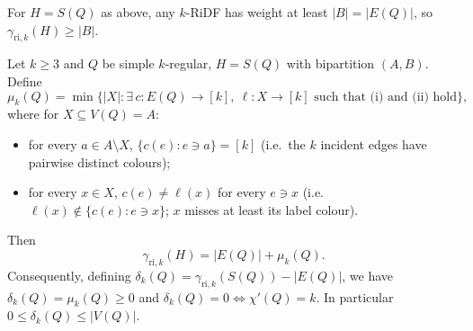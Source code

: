 \documentclass[10pt,a4paper]{amsart}
\newcommand{\gri}{\gamma_{\mathrm{ri},k}}
\newcommand{\setK}{[k]}
\begin{document}
\begin{corollary}\label{cor:lowerbound}
For $H=S(Q)$ as above, any $k$-RiDF has weight at least $|B|=|E(Q)|$, so $\gri(H)\ge|B|$.
\end{corollary}

\begin{theorem}\label{thm:representation}
Let $k\ge 3$ and $Q$ be simple $k$-regular, $H=S(Q)$ with bipartition $(A,B)$.
Define
\[
\mu_{k}(Q)=\min\{|X|: \exists\,c\colon E(Q)\to\setK,\ \ell\colon X\to\setK\text{ such that (i) and (ii) hold}\},
\]
where for $X\subseteq V(Q)=A$:
\begin{itemize}
\item[(i)] for every $a\in A\setminus X$, $\{c(e):e\ni a\}=\setK$ (i.e.\ the $k$ incident edges have pairwise distinct colours);
\item[(ii)] for every $x\in X$, $c(e)\neq\ell(x)$ for every $e\ni x$ (i.e.\ $\ell(x)\notin\{c(e):e\ni x\}$; $x$ misses at least its label colour).
\end{itemize}
Then
\[
\gri(H)=|E(Q)|+\mu_{k}(Q).
\]
Consequently, defining $\delta_{k}(Q)=\gri(S(Q))-|E(Q)|$, we have $\delta_{k}(Q)=\mu_{k}(Q)\ge0$ and $\delta_{k}(Q)=0\iff\chi'(Q)=k$. In particular $0\le\delta_{k}(Q)\le|V(Q)|$.
\end{theorem}
\end{document}
